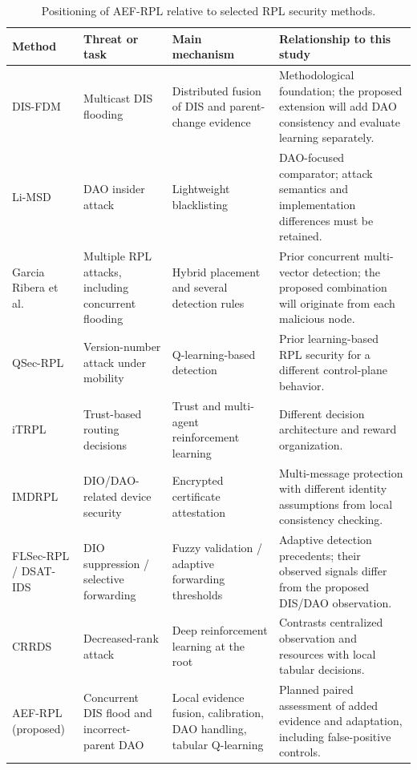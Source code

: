 \documentclass[journal]{IEEEtran}
\begin{document}
\begin{table}[t]
\caption{Positioning of AEF-RPL relative to selected RPL security methods.}
\label{tab:positioning}
\centering
\footnotesize
\setlength{\tabcolsep}{5pt}
\renewcommand{\arraystretch}{1.16}
\begin{tabularx}{\textwidth}{@{}p{}p{}p{}X@{}}
\toprule
Method & Threat or task & Main mechanism & Relationship to this study \\
\midrule
DIS-FDM \cite{prajisha2025} & Multicast DIS flooding & Distributed fusion of DIS and parent-change evidence & Methodological foundation; the proposed extension will add DAO consistency and evaluate learning separately. \\
Li-MSD \cite{limsd2024} & DAO insider attack & Lightweight blacklisting & DAO-focused comparator; attack semantics and implementation differences must be retained. \\
Garcia Ribera et al.\ \cite{garciaribera2022} & Multiple RPL attacks, including concurrent flooding & Hybrid placement and several detection rules & Prior concurrent multi-vector detection; the proposed combination will originate from each malicious node. \\
QSec-RPL \cite{qsecrpl2023} & Version-number attack under mobility & Q-learning-based detection & Prior learning-based RPL security for a different control-plane behavior. \\
iTRPL \cite{itrpl2024} & Trust-based routing decisions & Trust and multi-agent reinforcement learning & Different decision architecture and reward organization. \\
IMDRPL \cite{imdrpl2023} & DIO/DAO-related device security & Encrypted certificate attestation & Multi-message protection with different identity assumptions from local consistency checking. \\
FLSec-RPL / DSAT-IDS \cite{flsecrpl2024,dsatids2024} & DIO suppression / selective forwarding & Fuzzy validation / adaptive forwarding thresholds & Adaptive detection precedents; their observed signals differ from the proposed DIS/DAO observation. \\
CRRDS \cite{haqdad2026} & Decreased-rank attack & Deep reinforcement learning at the root & Contrasts centralized observation and resources with local tabular decisions. \\
AEF-RPL (proposed) & Concurrent DIS flood and incorrect-parent DAO & Local evidence fusion, calibration, DAO handling, tabular Q-learning & Planned paired assessment of added evidence and adaptation, including false-positive controls. \\
\bottomrule
\end{tabularx}
\end{table}
\end{document}
